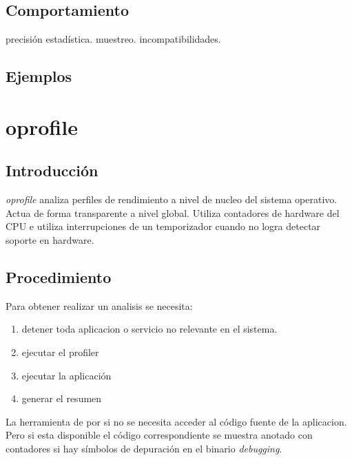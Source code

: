 \documentclass[a4paper]{report}
\begin{document}
\subsection{Comportamiento}

precisi\'on estad\'istica. muestreo. incompatibilidades.

\subsection{Ejemplos}

\section{oprofile}

\subsection{Introducci\'on}

{\it oprofile} analiza perfiles de rendimiento a nivel de nucleo del
sistema operativo. Actua de forma transparente a nivel global. Utiliza
contadores de hardware del CPU e utiliza interrupciones de un temporizador
cuando no logra detectar soporte en hardware.


\subsection{Procedimiento}

Para obtener realizar un analisis se necesita:

\begin{enumerate}

\item detener toda aplicacion o servicio no relevante en el sistema.

\item ejecutar el profiler

\item ejecutar la aplicaci\'on

\item generar el resumen

\end{enumerate}

La herramienta de por si no se necesita acceder al c\'odigo fuente de la aplicacion.
Pero si esta disponible el c\'odigo correspondiente se muestra anotado con contadores
si hay s\'imbolos de depuraci\'on en el binario {\it debugging}.
\end{document}
